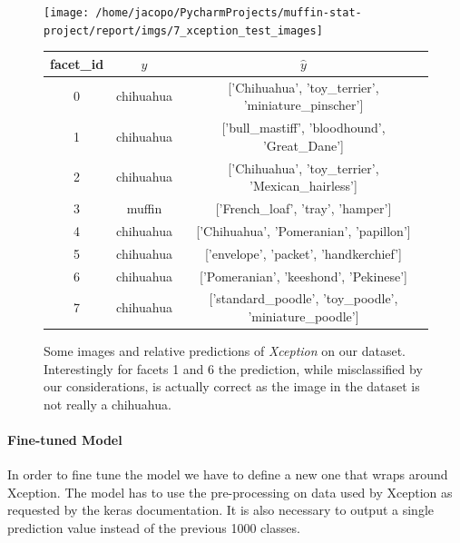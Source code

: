 \begin{figure}
    \centering

    \texttt{[image: /home/jacopo/PycharmProjects/muffin-stat-project/report/imgs/7\_xception\_test\_images]}
    \begin{tabular}{ | c | c | c | }
        \hline
        facet\_id & $y$       & $\hat{y}$                                                \\
        \hline\hline
        0         & chihuahua & ['Chihuahua', 'toy\_terrier', 'miniature\_pinscher']     \\
        \hline
        1         & chihuahua & ['bull\_mastiff', 'bloodhound', 'Great\_Dane']           \\
        \hline
        2         & chihuahua & ['Chihuahua', 'toy\_terrier', 'Mexican\_hairless']       \\
        \hline
        3         & muffin    & ['French\_loaf', 'tray', 'hamper']                       \\
        \hline
        4         & chihuahua & ['Chihuahua', 'Pomeranian', 'papillon']                  \\
        \hline
        5         & chihuahua & ['envelope', 'packet', 'handkerchief']                   \\
        \hline
        6         & chihuahua & ['Pomeranian', 'keeshond', 'Pekinese']                   \\
        \hline
        7         & chihuahua & ['standard\_poodle', 'toy\_poodle', 'miniature\_poodle'] \\
        \hline
    \end{tabular}


    \caption{Some images and relative predictions of \textit{Xception} on our dataset.\\
    Interestingly for facets 1 and 6 the prediction, while misclassified by our considerations, is actually correct
    as the image in the dataset is not really a chihuahua.
    }
    \label{fig:7_xception_test}
\end{figure}



\paragraph{Fine-tuned Model}
In order to fine tune the model we have to define a new one that wraps around Xception.
The model has to use the pre-processing on data used by Xception as requested by the keras documentation.
It is also necessary to output a single prediction value instead of the previous 1000 classes.

